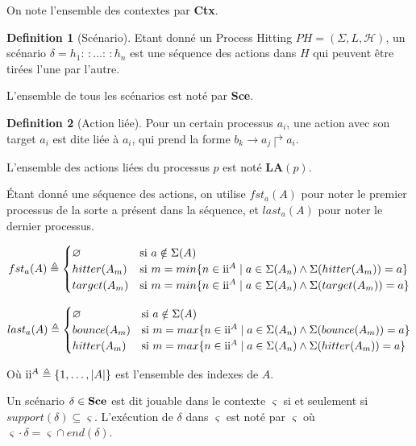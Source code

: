 \documentclass[11pt]{report}
\theoremstyle{definition}
\newtheorem{Def}{Definition}[chapter]
\newcommand{\ac}[3]{$#1\to#2\Rsh#3$}
\begin{document}
On note l'ensemble des contextes par {\bf Ctx}.
\begin{Def}[Sc\'enario]
Etant donn\'e un Process Hitting $PH=(\Sigma, L, \mathscr{H})$, un sc\'enario $\delta=h_1:\,:...:\,:h_n$ est une s\'equence des actions dans $H$ qui peuvent \^etre tir\'ees l'une par l'autre. %
\end{Def}
L'ensemble de tous les sc\'enarios est not\'e par {\bf Sce}.
\begin{Def}[Action li\'ee]
Pour un certain processus $a_i$, une action avec son target $a_i$ est dite li\'ee \`a $a_i$, qui prend la forme \ac{b_k}{a_j}{a_i}.
\end{Def}
L'ensemble des actions li\'ees du processus $p$ est not\'e $\mathbf{LA}(p)$.

\'Etant donn\'e une s\'equence des actions, on utilise $fst_a (A)$ pour noter le premier processus de la sorte a pr\'esent dans la s\'equence, et $last_a (A)$ pour noter le dernier processus.

$$fst_a(A)\triangleq 
\begin{cases}
\varnothing &\text{si }a \notin\Sigma(A)\\
             hitter(A_m) &\text{si }m=min\{n \in \text{\uppercase\expandafter{\romannumeral2}}^A\mid a \in \Sigma(A_n)
             \land\Sigma(hitter(A_m))=a\}\\ 
             target(A_m) &\text{si }m=min\{n \in \text{\uppercase\expandafter{\romannumeral2}}^A\mid a \in \Sigma(A_n)
             \land\Sigma(target(A_m))=a\}
\end{cases}
$$

$$last_a(A)\triangleq 
\begin{cases}
\varnothing &\text{si }a \notin\Sigma(A)\\
             bounce(A_m) &\text{si }m=max\{n \in \text{\uppercase\expandafter{\romannumeral2}}^A\mid a \in \Sigma(A_n)
             \land\Sigma(bounce(A_m))=a\}\\ 
             hitter(A_m) &\text{si }m=max\{n \in \text{\uppercase\expandafter{\romannumeral2}}^A\mid a \in \Sigma(A_n)
             \land\Sigma(hitter(A_m))=a\}\\  
\end{cases}
$$

O\`u $\text{\uppercase\expandafter{\romannumeral2}}^A\triangleq\{1,\ldots,|A|\}$ est l'ensemble des indexes de $A$.

Un sc\'enario $\delta\in{\bf Sce}$ est dit jouable dans le contexte $\varsigma$ si et seulement si $support(\delta)\subseteq\varsigma$. L'ex\'ecution de $\delta$ dans $\varsigma$ est not\'e par $\varsigma$ o\`u $\varsigma\cdot\delta=\varsigma\cap end(\delta)$.
\end{document}
